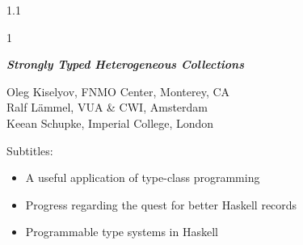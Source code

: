 \documentclass{slides}
\newenvironment{myslide}{\begin{slide}\color{Blue}\begin{boxedminipage}{1.1\hsize}\begin{boxedminipage}{1\hsize}\color{Black}
\vspace{-170\in}
}{%
\smallskip
\end{boxedminipage}
\end{boxedminipage}
\end{slide}}
\newenvironment{myslide}{\begin{slide}
}{%
\end{slide}}
\newenvironment{myslide}{\begin{slide}\color{White}\begin{boxedminipage}{1.1\hsize}\color{Black}
\vspace{-170\in}
}{%
\smallskip
\end{boxedminipage}
\end{slide}}
\newcommand{\littleskip}{\topsep8pt \parskip8pt \partopsep8pt}
\newcommand{\header}[1]{{\large \color{Red} #1}}
\newcommand{\blau}[1]{{\vspace{-50\in}\normalsize \color{Blue} #1}}
\begin{document}
\pagestyle{empty}



\begin{comment}
\begin{slide}
 
Press PgDn to start.
 
\end{slide}
\end{comment}






\begin{myslide}

\bigskip

\begin{center}
\header{{\itshape\normalsize \textbf{Strongly Typed Heterogeneous Collections}}}
\end{center}

\bigskip
\bigskip

{\small

\blau{

Oleg Kiselyov, FNMO Center, Monterey, CA\\
Ralf L{\"a}mmel, VUA \& CWI, Amsterdam\\
Keean Schupke, Imperial College, London

}


\bigskip

Subtitles:

{\littleskip\begin{itemize}
\item A useful application of type-class programming
\item Progress regarding the quest for better Haskell records
\item Programmable type systems in Haskell
\end{itemize}}

}

\bigskip
\bigskip


\end{myslide}



\end{document}
